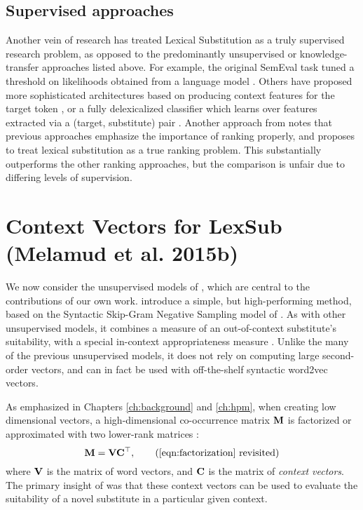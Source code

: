 \subsection{Supervised approaches}

Another vein of research has treated Lexical Substitution as a truly
supervised research problem, as opposed to the predominantly unsupervised or
knowledge-transfer approaches listed above. For example, the original SemEval
task tuned a threshold on likelihoods obtained from a language
model \cite{yuret:2007:semeval}. Others have proposed more sophisticated
architectures based on producing context features for the target token
\cite{biemann:2012:lrec}, or a fully delexicalized classifier which learns over
features extracted via a (target, substitute) pair \cite{szarvas:2013:naacl}.
Another approach from  notes that previous
approaches emphasize the importance of ranking properly, and proposes to treat
lexical substitution as a true ranking problem. This substantially outperforms
the other ranking approaches, but the comparison is unfair due to differing
levels of supervision.

\section{Context Vectors for LexSub (Melamud et al. 2015b)}
\label{sec:melamud}

We now consider the unsupervised models of , which
are central to the contributions of our own work.
 introduce a simple, but high-performing method,
based on the Syntactic Skip-Gram Negative Sampling model of
. As with other unsupervised models, it combines a
measure of an out-of-context substitute's suitability, with a special
in-context appropriateness measure \cite{erk:2008:emnlp}. Unlike the many of
the previous unsupervised models, it does not rely on computing large
second-order vectors, and can in fact be used with off-the-shelf syntactic
word2vec vectors.

As emphasized in Chapters \ref{ch:background} and \ref{ch:hpm}, when creating
low dimensional vectors, a high-dimensional co-occurrence matrix ${{\mathbf{M}}}$ is
factorized or approximated with two lower-rank matrices \cite{levy:2014:nips}:
\begin{equation*}
  \mM = \mV\mC\trans,
  \tag{\ref{eqn:factorization} revisited}
\end{equation*}
where ${{\mathbf{V}}}$ is the matrix of word vectors, and ${{\mathbf{C}}}$ is the matrix of
{\em context vectors}. The primary insight of 
was that these context vectors can be used to evaluate the suitability of a
novel substitute in a particular given context.

